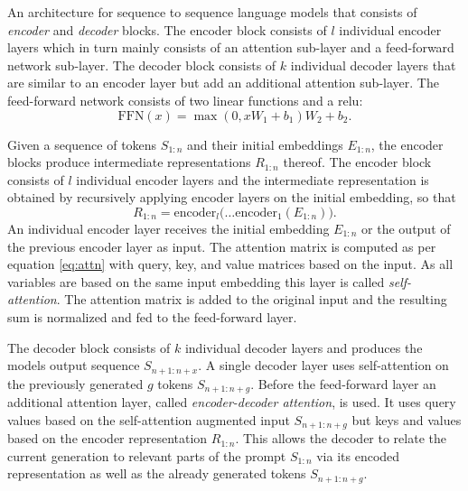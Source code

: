     \begin{definition}
    \label{def:transformer}
        An architecture for sequence to sequence language models that consists of \emph{encoder} and \emph{decoder} blocks.
        The encoder block consists of $l$ individual encoder layers which in turn mainly consists of an attention sub-layer and a feed-forward network sub-layer.
        The decoder block consists of $k$ individual decoder layers that are similar to an encoder layer but add an additional attention sub-layer.
        The feed-forward network consists of two linear functions and a \ac{relu}:
        \begin{equation}
            \mathrm{FFN}(x) = \max(0,xW_1 + b_1)W_2 + b_2 \text{.}
        \end{equation}
        
        Given a sequence of tokens $S_{1:n}$ and their initial embeddings $E_{1:n}$, the encoder blocks produce intermediate representations $R_{1:n}$ thereof.
        The encoder block consists of $l$ individual encoder layers and the  intermediate representation is obtained by recursively applying encoder layers on the initial embedding, so that
        \begin{equation}
            R_{1:n} = \mathrm{encoder}_l \big( \dots \mathrm{encoder}_1(E_{1:n}) \big) \text{.}
        \end{equation}
        An individual encoder layer receives the initial embedding $E_{1:n}$ or the output of the previous encoder layer as input.
        The attention matrix is computed as per equation \ref{eq:attn} with query, key, and value matrices based on the input.
        As all variables are based on the same input embedding this layer is called \emph{self-attention}.
        The attention matrix is added to the original input and the resulting sum is normalized and fed to the feed-forward layer.

        The decoder block consists of $k$ individual decoder layers and produces the models output sequence $S_{n+1:n+x}$.
        A single decoder layer uses self-attention on the previously generated $g$ tokens $S_{n+1:n+g}$.
        Before the feed-forward layer an additional attention layer, called \emph{encoder-decoder attention}, is used.
        It uses query values based on the self-attention augmented input $S_{n+1:n+g}$ but keys and values based on the encoder representation $R_{1:n}$.
        This allows the decoder to relate the current generation to relevant parts of the prompt $S_{1:n}$ via its encoded representation as well as the already generated tokens $S_{n+1:n+g}$.
    \end{definition}

